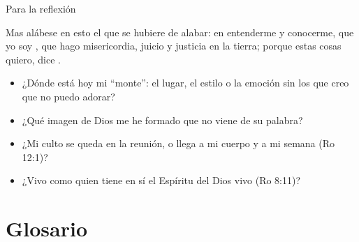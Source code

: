 \begin{frame}{Para la reflexión}
\begin{cita}Mas alábese en esto el que se hubiere de alabar: en entenderme y conocerme, que yo soy \SENOR, que hago misericordia, juicio y justicia en la tierra; porque estas cosas quiero, dice \SENOR.\end{cita}
\begin{center}\end{center}
\small
\begin{itemize}
\item ¿Dónde está hoy mi ``monte'': el lugar, el estilo o la emoción sin los que creo que no puedo adorar?
\item ¿Qué imagen de Dios me he formado que no viene de su palabra?
\item ¿Mi culto se queda en la reunión, o llega a mi cuerpo y a mi semana (Ro 12:1)?
\item ¿Vivo como quien tiene en sí el Espíritu del Dios vivo (Ro 8:11)?
\end{itemize}
\end{frame}

\section{Glosario}

